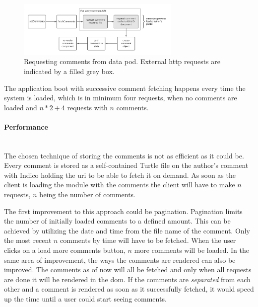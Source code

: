 \begin{figure}[!ht]
    \centering
    \includegraphics[width=0.7\textwidth]{prototype/graphs/poc-comment-flow-set_comments.png}
    \caption{Requesting comments from data pod. External \gls{http} requests are indicated by a filled grey box.}
    \label{fig:poc-comment-flow-set_comments}
\end{figure}

The application boot with successive comment fetching happens every time the system is loaded, which is in minimum four requests, when no comments are loaded and $n*2+4$ requests with $n$ comments.

\vspace{0.5cm}
\paragraph{Performance}\label{paragraph:evaluation-performance}\mbox{}\\

The chosen technique of storing the comments is not as efficient as it could be. Every comment is stored as a self-contained Turtle file on the author's comment with Indico holding the \gls{uri} to be able to fetch it on demand. As soon as the client is loading the module with the comments the client will have to make $n$ requests, $n$ being the number of comments.

The first improvement to this approach could be pagination. Pagination limits the number of initially loaded comments to a defined amount. This can be achieved by utilizing the date and time from the file name of the comment. Only the most recent $n$ comments by time will have to be fetched. When the user clicks on a load more comments button, $n$ more comments will be loaded.
In the same area of improvement, the ways the comments are rendered can also be improved. The comments as of now will all be fetched and only when all requests are done it will be rendered in the \gls{dom}. If the comments are \textit{separated} from each other and a comment is rendered as soon as it successfully fetched, it would speed up the time until a user could start seeing comments.


